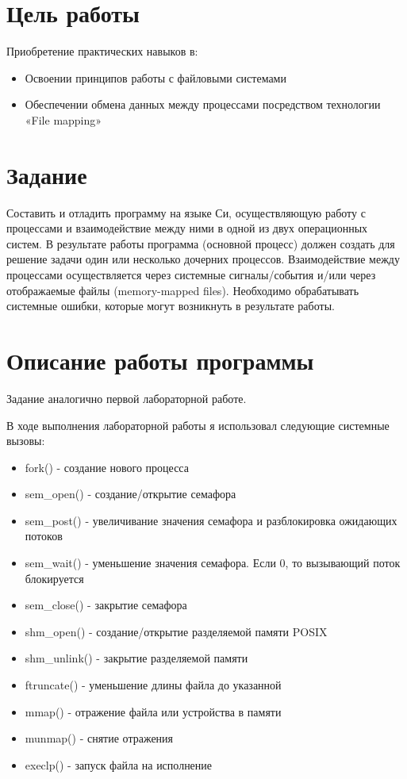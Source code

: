 \documentclass[a4paper, 12pt]{article}
\begin{document}
\section{Цель работы}
Приобретение практических навыков в:
\begin{itemize}
  \item Освоении принципов работы с файловыми системами
  \item Обеспечении обмена данных между процессами посредством технологии «File mapping»
\end{itemize}

\section{Задание}
Составить и отладить программу на языке Си, осуществляющую работу с процессами и взаимодействие между ними в одной из двух операционных систем. В результате работы программа (основной процесс) должен создать для решение задачи один или несколько дочерних процессов. Взаимодействие между процессами осуществляется через системные сигналы/события и/или через отображаемые файлы (memory-mapped files).
Необходимо обрабатывать системные ошибки, которые могут возникнуть в результате работы.

\section{Описание работы программы}
Задание аналогично первой лабораторной работе.

В ходе выполнения лабораторной работы я использовал следующие системные вызовы:
\begin{itemize}
  \item fork() - создание нового процесса
  \item sem\_open() - создание/открытие семафора
  \item sem\_post() - увеличивание значения семафора и разблокировка ожидающих потоков
  \item sem\_wait() - уменьшение значения семафора. Если 0, то вызывающий поток блокируется 
  \item sem\_close() - закрытие семафора
  \item shm\_open() - создание/открытие разделяемой памяти POSIX
  \item shm\_unlink() - закрытие разделяемой памяти
  \item ftruncate() - уменьшение длины файла до указанной  
  \item mmap() - отражение файла или устройства в памяти
  \item munmap() - снятие отражения
  \item execlp() - запуск файла на исполнение
  
\end{itemize}
\end{document}

